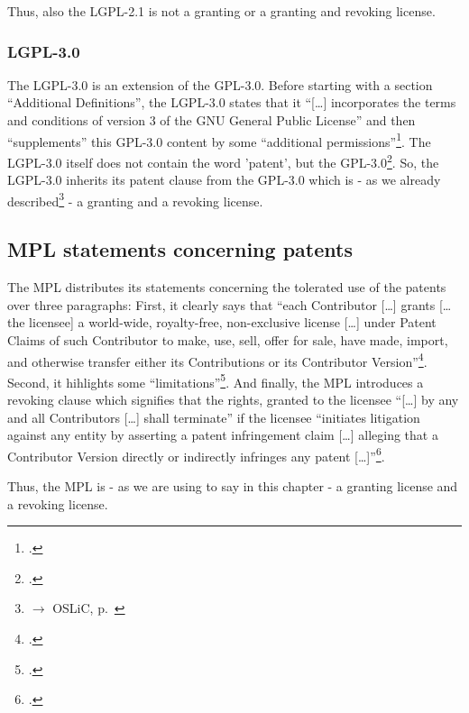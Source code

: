 Thus, also the LGPL-2.1 is not a granting or a granting and revoking license.

\subsubsection {LGPL-3.0}\label{subsec:Lgpl30PatentClause}

The LGPL-3.0 is an extension of the GPL-3.0. Before starting with a section
\enquote{Additional Definitions}, the LGPL-3.0 states that it \enquote{[\ldots]
incorporates the terms and conditions of version 3 of the GNU General Public
License} and then \enquote{supplements} this GPL-3.0 content by some
\enquote{additional permissions}\footcite[cf.][\nopage
wp.]{Lgpl30OsiLicense2007a}. The LGPL-3.0 itself does not contain the word
'patent', but the GPL-3.0\footcite[cf.][\nopage wp.\ §11]{Gpl30OsiLicense2007a}.
So, the LGPL-3.0 inherits its patent clause from the GPL-3.0 which is - as we
already described\footnote{$\rightarrow$ OSLiC, p.\
\pageref{subsec:Gpl30PatentClause}} - a granting and a revoking license.
 
\subsection{MPL statements concerning patents}\label{subsec:MplPatentClause}

The MPL distributes its statements concerning the tolerated use of the patents
over three paragraphs: First, it clearly says that \enquote{each Contributor
[\ldots] grants [\ldots the licensee] a world-wide, royalty-free, non-exclusive
license [\ldots] under Patent Claims of such Contributor to make, use, sell,
offer for sale, have made, import, and otherwise transfer either its
Contributions or its Contributor Version}\footcite[cf.][\nopage wp.\ §2.1, esp.
§2.1.b]{Mpl20OsiLicense2013a}. Second, it hihlights some
\enquote{limitations}\footcite[cf.][\nopage wp.\ §2.1, esp.
§2.3]{Mpl20OsiLicense2013a}. And finally, the MPL introduces a revoking clause
which signifies that the rights, granted to the licensee \enquote{[\ldots] by
any and all Contributors [\ldots] shall terminate} if the licensee
\enquote{initiates litigation against any entity by asserting a patent
infringement claim [\ldots] alleging that a Contributor Version directly or
indirectly infringes any patent [\ldots]}\footcite[cf.][\nopage wp.\
§5.2]{Mpl20OsiLicense2013a}.

Thus, the MPL is - as we are using to say in this chapter - a granting license
and a revoking license.

